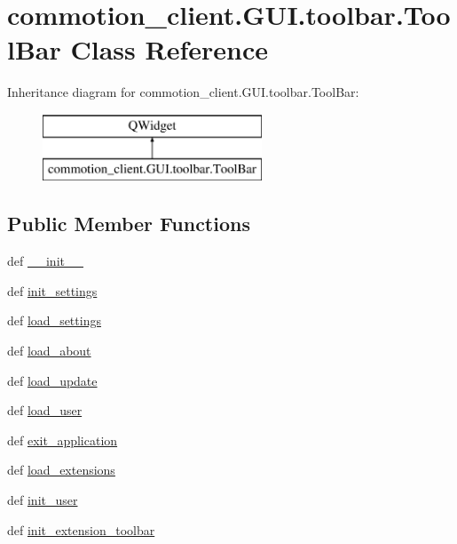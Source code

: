 \hypertarget{classcommotion__client_1_1GUI_1_1toolbar_1_1ToolBar}{\section{commotion\+\_\+client.\+G\+U\+I.\+toolbar.\+Tool\+Bar Class Reference}
\label{classcommotion__client_1_1GUI_1_1toolbar_1_1ToolBar}
}
Inheritance diagram for commotion\+\_\+client.\+G\+U\+I.\+toolbar.\+Tool\+Bar\+:\begin{figure}[H]
\begin{center}
\leavevmode
\includegraphics[height=2.000000cm]{classcommotion__client_1_1GUI_1_1toolbar_1_1ToolBar}
\end{center}
\end{figure}
\subsection*{Public Member Functions}
\begin{DoxyCompactItemize}
\item 
def \hyperlink{classcommotion__client_1_1GUI_1_1toolbar_1_1ToolBar_acea995f0bbf3a6e28c07b315e07b0af6}{\+\_\+\+\_\+init\+\_\+\+\_\+}
\item 
def \hyperlink{classcommotion__client_1_1GUI_1_1toolbar_1_1ToolBar_acb467ccaffdcd2c10fcce88a2d167079}{init\+\_\+settings}
\item 
def \hyperlink{classcommotion__client_1_1GUI_1_1toolbar_1_1ToolBar_a153dabe13871140e3d77226b986d8c37}{load\+\_\+settings}
\item 
def \hyperlink{classcommotion__client_1_1GUI_1_1toolbar_1_1ToolBar_a8fa89f6fa79c20123cdb74d3af3ecea5}{load\+\_\+about}
\item 
def \hyperlink{classcommotion__client_1_1GUI_1_1toolbar_1_1ToolBar_a186956c277f9ab85c6e1dcb73ec241ab}{load\+\_\+update}
\item 
def \hyperlink{classcommotion__client_1_1GUI_1_1toolbar_1_1ToolBar_a63bb48ec46de8e3982fb6e8ebcd05954}{load\+\_\+user}
\item 
def \hyperlink{classcommotion__client_1_1GUI_1_1toolbar_1_1ToolBar_ad0a0117438047cffdf421c9175c8e73a}{exit\+\_\+application}
\item 
def \hyperlink{classcommotion__client_1_1GUI_1_1toolbar_1_1ToolBar_a498f1b3352a8c1ee491921afb707fafa}{load\+\_\+extensions}
\item 
def \hyperlink{classcommotion__client_1_1GUI_1_1toolbar_1_1ToolBar_a232fde172cdeaf4c9c4b2dbc14a03cf3}{init\+\_\+user}
\item 
def \hyperlink{classcommotion__client_1_1GUI_1_1toolbar_1_1ToolBar_ad0e0bfc7e79a78a00253bebcc65c1a00}{init\+\_\+extension\+\_\+toolbar}
\end{DoxyCompactItemize}
